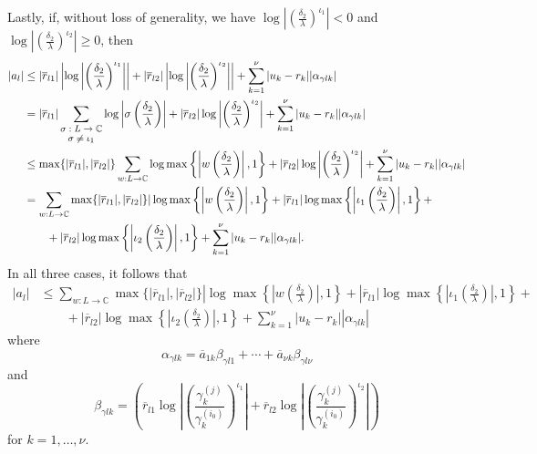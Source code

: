 Lastly, if, without loss of generality, we have $\log\left|\left(\frac{\delta_2}{\lambda}\right)^{\iota_1}\right| < 0$ and $\log\left|\left(\frac{\delta_2}{\lambda}\right)^{\iota_2}\right| \geq 0$, then
\begin{align*}
|a_l| 	& \leq |\overline{r}_{l1}|\left|\log\left|\left(\frac{\delta_2}{\lambda}\right)^{\iota_1}\right|\right| + |\overline{r}_{l2}|\left|\log\left|\left(\frac{\delta_2}{\lambda}\right)^{\iota_2}\right|\right| + \sum_{k=1}^{\nu}|u_k-r_k||\alpha_{\gamma l k}|\\
	& = |\overline{r}_{l1}|\sum_{\shortstack{\footnotesize $\sigma: L \to \mathbb{C} $\\ \footnotesize $ \sigma \neq \iota_1$}} \log\left|\sigma \left(\frac{\delta_2}{\lambda}\right)\right|+ |\overline{r}_{l2}|\log\left|\left(\frac{\delta_2}{\lambda}\right)^{\iota_2}\right| + \sum_{k=1}^{\nu}|u_k-r_k||\alpha_{\gamma l k}|\\
	& \leq \max\{|\overline{r}_{l1}|, |\overline{r}_{l2}|\}\sum_{w: L \to \mathbb{C}} \log \max \left\{\left|w\left(\frac{\delta_2}{\lambda}\right)\right|, 1\right\} +  |\overline{r}_{l2}|\log\left|\left(\frac{\delta_2}{\lambda}\right)^{\iota_2}\right| +\sum_{k=1}^{\nu}|u_k-r_k||\alpha_{\gamma l k}|\\
	& = \sum_{w: L \to \mathbb{C}}\max\{|\overline{r}_{l1}|, |\overline{r}_{l2}|\}|\log\max\left\{\left|w\left(\frac{\delta_2}{\lambda}\right)\right|,1\right\} + |\overline{r}_{l1}|\log\max\left\{\left|\iota_1\left(\frac{\delta_2}{\lambda}\right)\right|,1\right\}+ \\
	&\quad\quad + |\overline{r}_{l2}|\log\max\left\{\left|\iota_2\left(\frac{\delta_2}{\lambda}\right)\right|,1\right\}+ \sum_{k=1}^{\nu}|u_k-r_k||\alpha_{\gamma l k}|.
\end{align*}
In all three cases, it follows that
\begin{align*}
|a_l|	& \leq \sum_{w: L \to \mathbb{C}}\max\{|\overline{r}_{l1}|, |\overline{r}_{l2}|\}|\log\max\left\{\left|w\left(\frac{\delta_2}{\lambda}\right)\right|,1\right\} + |\overline{r}_{l1}|\log\max\left\{\left|\iota_1\left(\frac{\delta_2}{\lambda}\right)\right|,1\right\} + \\
	&\quad\quad + |\overline{r}_{l2}|\log\max\left\{\left|\iota_2\left(\frac{\delta_2}{\lambda}\right)\right|,1\right\}+ \sum_{k=1}^{\nu}|u_k-r_k||\alpha_{\gamma l k}|
\end{align*}
where
\[\alpha_{\gamma l k} = \overline{a}_{1k}\beta_{\gamma l 1} + \cdots + \overline{a}_{\nu k}\beta_{\gamma l \nu}\]
and
\[\beta_{\gamma l k} = \left(\overline{r}_{l1} \log\left| \left( \frac{\gamma_k^{(j)}}{\gamma_k^{(i_0)}}\right)^{\iota_1}\right|+ \overline{r}_{l2}\log\left| \left( \frac{\gamma_k^{(j)}}{\gamma_k^{(i_0)}}\right)^{\iota_2}\right|\right)\]
for $k = 1, \dots, \nu$.

